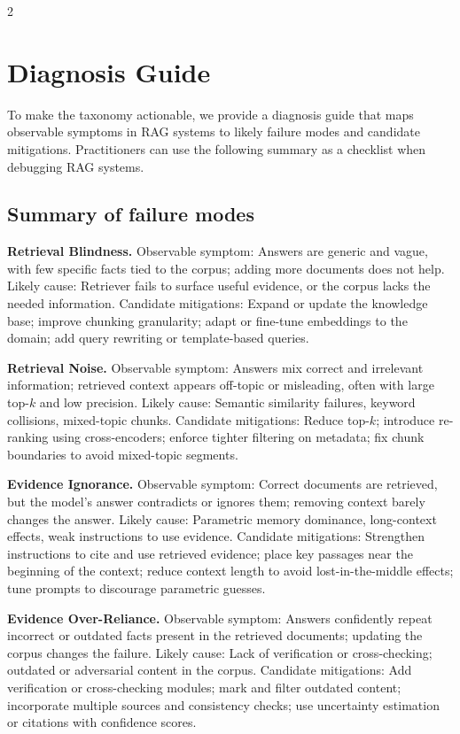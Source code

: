 \documentclass[11pt,a4paper]{article}
\begin{document}
\begin{multicols}{2}
\section{Diagnosis Guide}
\label{sec:diagnosis}

To make the taxonomy actionable, we provide a diagnosis guide that maps observable symptoms in RAG systems to likely failure modes and candidate mitigations. Practitioners can use the following summary as a checklist when debugging RAG systems.

\subsection*{Summary of failure modes}

\textbf{Retrieval Blindness.}
Observable symptom: Answers are generic and vague, with few specific facts tied to the corpus; adding more documents does not help.
Likely cause: Retriever fails to surface useful evidence, or the corpus lacks the needed information.
Candidate mitigations: Expand or update the knowledge base; improve chunking granularity; adapt or fine-tune embeddings to the domain; add query rewriting or template-based queries.

\textbf{Retrieval Noise.}
Observable symptom: Answers mix correct and irrelevant information; retrieved context appears off-topic or misleading, often with large top-$k$ and low precision.
Likely cause: Semantic similarity failures, keyword collisions, mixed-topic chunks.
Candidate mitigations: Reduce top-$k$; introduce re-ranking using cross-encoders; enforce tighter filtering on metadata; fix chunk boundaries to avoid mixed-topic segments.

\textbf{Evidence Ignorance.}
Observable symptom: Correct documents are retrieved, but the model's answer contradicts or ignores them; removing context barely changes the answer.
Likely cause: Parametric memory dominance, long-context effects, weak instructions to use evidence.
Candidate mitigations: Strengthen instructions to cite and use retrieved evidence; place key passages near the beginning of the context; reduce context length to avoid lost-in-the-middle effects; tune prompts to discourage parametric guesses.

\textbf{Evidence Over-Reliance.}
Observable symptom: Answers confidently repeat incorrect or outdated facts present in the retrieved documents; updating the corpus changes the failure.
Likely cause: Lack of verification or cross-checking; outdated or adversarial content in the corpus.
Candidate mitigations: Add verification or cross-checking modules; mark and filter outdated content; incorporate multiple sources and consistency checks; use uncertainty estimation or citations with confidence scores.


\end{multicols}
\end{document}
